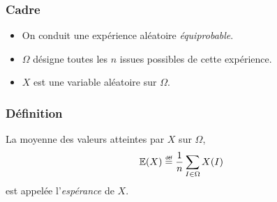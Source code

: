 \documentclass[main.tex]{subfiles}
\begin{document}
\begin{definition}

    \subsubsection{Cadre}
    \begin{itemize}
        \item On conduit une expérience aléatoire \emph{équiprobable}.
        \item $\Omega$ désigne toutes les $n$ issues possibles de cette expérience.
        \item $X$ est une variable aléatoire sur $\Omega$.
    \end{itemize}

    \subsubsection{Définition}
    La moyenne des valeurs atteintes par $X$ sur $\Omega$,
    \begin{align}
        \E(X) \defeq \frac 1 n \sum_{I \in \Omega} X(I)
    \end{align}
    est appelée l'\emph{espérance} de $X$.
\end{definition}
\end{document}
